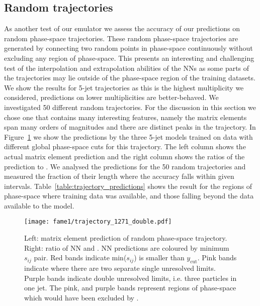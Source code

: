 \documentclass[main.tex]{subfiles}
\begin{document}
\subsection{Random trajectories}\label{sec:trajectories}
As another test of our emulator we assess the accuracy of our predictions on random phase-space trajectories.
These random phase-space trajectories are generated by connecting two random points in phase-space continuously without excluding any region of phase-space.
This presents an interesting and challenging test of the interpolation and extrapolation abilities of the NNs as some parts of the trajectories may lie outside of the phase-space region of the training datasets.
We show the results for 5-jet trajectories as this is the highest multiplicity we considered, predictions on lower multiplicities are better-behaved.
We investigated 50 different random trajectories. For the discussion in this section
we chose one that contains many interesting features,
namely the matrix elements span many orders of magnitudes and there are distinct peaks in the trajectory.
In Figure~\ref{fig:random_trajectory} we show the predictions by the three 5-jet models trained on data with different global phase-space cuts for this trajectory.
The left column shows the actual matrix element prediction and the right column shows the ratios of the prediction to {\NJet}.
We analysed the predictions for the 50 random trajectories and measured the fraction of their length where the accuracy falls within given intervals.
Table~\ref{table:trajectory_predictions} shows the result for the regions of phase-space where training data was available, and those falling beyond the data available to the model. 

\begin{figure}
    \centering
    \texttt{[image: fame1/trajectory\_1271\_double.pdf]}
    \caption{Left: matrix element prediction of random phase-space trajectory.
    Right: ratio of NN and {\NJet}.
    NN predictions are coloured by minimum $s_{ij}$ pair.
    Red bands indicate min($s_{ij}$) is smaller than $y_{\mathrm{cut}}$.
    Pink bands indicate where there are two separate single unresolved limits.
    Purple bands indicate double unresolved limits, i.e. three particles in one jet.
    The pink, and purple bands represent regions of phase-space which would have been excluded by {\FastJet}.}
    \label{fig:random_trajectory}
\end{figure}
\end{document}

